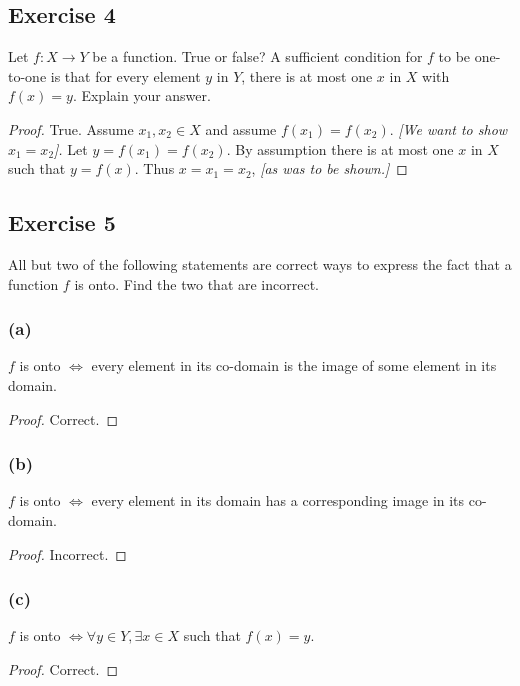 \documentclass[14pt]{extarticle}
\begin{document}
\subsection{Exercise 4}
Let \(f: X \to Y\) be a function. True or false? A sufficient condition for $f$ to be one-to-one is that for
every element $y$ in $Y$, there is at most one $x$ in $X$
with \(f(x) = y\). Explain your answer.

\begin{proof}
    True. Assume \(x_1, x_2 \in X\) and assume \(f(x_1) = f(x_2)\). {\it [We want to show \(x_1 = x_2\)].} Let
    \(y = f(x_1) = f(x_2)\). By assumption there is at most one $x$ in $X$ such that $y = f(x)$. Thus \(x = x_1 = x_2\),
    {\it [as was to be shown.]}
\end{proof}

\subsection{Exercise 5}
All but two of the following statements are correct ways to express the fact that a function $f$ is onto.
Find the two that are incorrect.

\subsubsection{(a)}
$f$ is onto $\iff$ every element in its co-domain is the image of some element in its domain.

\begin{proof}
    Correct.
\end{proof}

\subsubsection{(b)}
$f$ is onto $\iff$ every element in its domain has a corresponding image in its co-domain.

\begin{proof}
    Incorrect.
\end{proof}

\subsubsection{(c)}
$f$ is onto \(\iff  \forall y \in Y, \exists x \in X\) such that \(f(x) = y\).

\begin{proof}
    Correct.
\end{proof}
\end{document}

